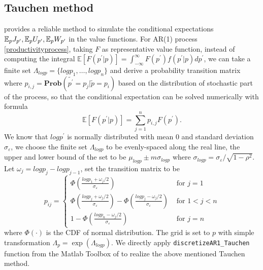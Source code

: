 \documentclass[10pt]{article} %
\begin{document}
    \subsection{Tauchen method}
    \cite{Tauchen1986} provides a reliable method to simulate the conditional expectations \(\mathbb{E}_p J_{p^\prime}, \\ \mathbb{E}_p U_{p^\prime}, \mathbb{E}_p W_{p^\prime}\) in the value functions. For AR(1) process \ref{productivityprocess}, taking $F$ as representative value function, instead of computing the integral \(\mathbb{E}[F(p^\prime|p)] = \int_{-\infty}^{\infty}F(p^\prime)f(p^\prime|p)dp^\prime\), we can take a finite set \(\Lambda_{logp} = \{logp_1, \ldots, logp_n\}\) and derive a probability transition matrix where \(p_{i,j}=\textbf{Prob} (\tilde{p^\prime} = p_j | \tilde{p} = p_i)\) based on the distribution of stochastic part of the process, so that the conditional expectation can be solved numerically with formula \[\mathbb{E}[F(p^\prime|p)] =\sum\limits_{j=1}^{n}p_{i,j}F(p^\prime).\]
    We know that $logp^\prime$ is normally distributed with mean 0 and standard deviation $\sigma_\varepsilon$, we choose the finite set $\Lambda_{logp}$ to be evenly-spaced along the real line, the upper and lower bound of the set to be \(\mu_{logp} \pm m\sigma_{logp}\) where \(\sigma_{logp} = \sigma_\varepsilon/\sqrt{1-\rho^2}\). Let \(\omega_j = {logp}_j - {logp}_{j-1}\), set the transition matrix to be
    \[p_{i j}= \begin{cases}\Phi\left(\frac{logp_1+\omega_j / 2}{\sigma_{\varepsilon}}\right) & \text { for } j=1 \\ \Phi\left(\frac{logp_j+\omega_j / 2}{\sigma_{\varepsilon}}\right)-\Phi\left(\frac{logp_j-\omega_j / 2}{\sigma_{\varepsilon}}\right) & \text { for } 1<j<n \\ 1-\Phi\left(\frac{logp_n-\omega_j / 2}{\sigma_{\varepsilon}}\right) & \text { for } j=n\end{cases}\] where $\Phi(\cdot)$ is the CDF of normal distribution.
    The grid is set to $p$ with simple transformation $\Lambda_p = \exp{(\Lambda_{logp})}$.
    \newline
    We directly apply \texttt{discretizeAR1\_Tauchen} function from the Matlab Toolbox of \cite{Kirkby2023} to realize the above mentioned Tauchen method.
\end{document}
